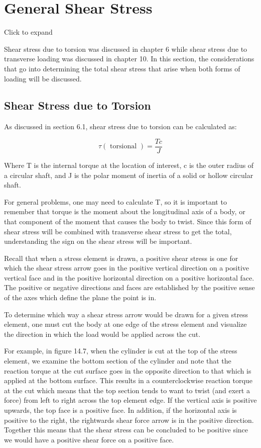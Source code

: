 \documentclass[
  letterpaper,
  DIV=11,
  numbers=noendperiod]{scrreprt}
\begin{document}
\section{General Shear Stress}\label{general-shear-stress}

Click to expand

Shear stress due to torsion was discussed in chapter 6 while shear
stress due to transverse loading was discussed in chapter 10. In this
section, the considerations that go into determining the total shear
stress that arise when both forms of loading will be discussed.

\subsection{Shear Stress due to
Torsion}\label{shear-stress-due-to-torsion}

As discussed in section 6.1, shear stress due to torsion can be
calculated as:

\[
\tau(\text { torsional })=\frac{T c}{J}
\]

Where T is the internal torque at the location of interest, c is the
outer radius of a circular shaft, and J is the polar moment of inertia
of a solid or hollow circular shaft.

For general problems, one may need to calculate T, so it is important to
remember that torque is the moment about the longitudinal axis of a
body, or that component of the moment that causes the body to twist.
Since this form of shear stress will be combined with transverse shear
stress to get the total, understanding the sign on the shear stress will
be important.

Recall that when a stress element is drawn, a positive shear stress is
one for which the shear stress arrow goes in the positive vertical
direction on a positive vertical face and in the positive horizontal
direction on a positive horizontal face. The positive or negative
directions and faces are established by the positive sense of the axes
which define the plane the point is in.

To determine which way a shear stress arrow would be drawn for a given
stress element, one must cut the body at one edge of the stress element
and visualize the direction in which the load would be applied across
the cut.

For example, in figure 14.7, when the cylinder is cut at the top of the
stress element, we examine the bottom section of the cylinder and note
that the reaction torque at the cut surface goes in the opposite
direction to that which is applied at the bottom surface. This results
in a counterclockwise reaction torque at the cut which means that the
top section tends to want to twist (and exert a force) from left to
right across the top element edge. If the vertical axis is positive
upwards, the top face is a positive face. In addition, if the horizontal
axis is positive to the right, the rightwards shear force arrow is in
the positive direction. Together this means that the shear stress can be
concluded to be positive since we would have a positive shear force on a
positive face.
\end{document}
